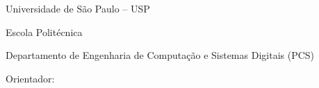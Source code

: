 \documentclass[12pt, oneside, a4paper, english, brazil]{abntex2}
\begin{document}
\frenchspacing

\begin{capa}
  \begin{center}
    {\large \imprimirautor}
    \vspace*{\fill}

    {\ABNTEXchapterfont\bfseries\LARGE \imprimirtitulo}
    \vspace*{\fill}

    {\large \imprimirlocal}\par
    {\large \imprimirdata}
    \vspace*{1cm}
  \end{center}
\end{capa}

\begin{center}
  \thispagestyle{empty}
  {\large \imprimirautor}
  \vspace*{\fill}

  {\ABNTEXchapterfont\bfseries\Large \imprimirtitulo}
  \vspace*{\fill}

  \hspace{.45\textwidth}
  \begin{minipage}{.5\textwidth}
    \SingleSpacing\small \imprimirpreambulo
  \end{minipage}
  \vspace*{\fill}

  Universidade de São Paulo -- USP\par
  Escola Politécnica\par
  Departamento de Engenharia de Computação e Sistemas Digitais (PCS)
  \vspace*{\fill}

  Orientador: \imprimirorientador
  \vspace*{\fill}

  \imprimirlocal\par
  \imprimirdata
\end{center}
\cleardoublepage

\tableofcontents*
\cleardoublepage

\textual

\end{document}
